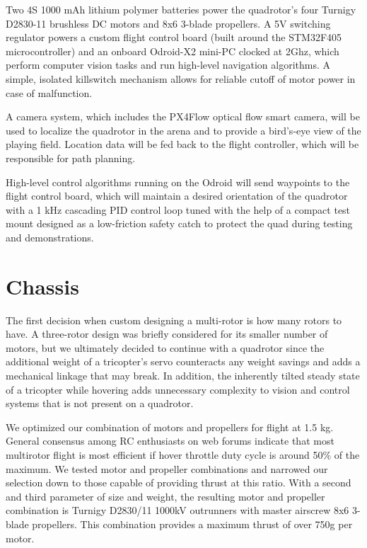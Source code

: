\documentclass[12pt,letterpaper]{article} \usepackage[margin=1in]{geometry}
\begin{document}
Two 4S 1000 mAh lithium polymer batteries power the quadrotor's four Turnigy
D2830-11 brushless DC motors and 8x6 3-blade propellers. A 5V switching
regulator powers a custom flight control board (built around the STM32F405
microcontroller) and an onboard Odroid-X2 mini-PC clocked at 2Ghz, which
perform computer vision tasks and run high-level navigation algorithms.
A simple, isolated killswitch mechanism allows for reliable cutoff of motor
power in case of malfunction.

A camera system, which includes the PX4Flow optical flow smart camera, will be
used to localize the quadrotor in the arena and to provide a bird's-eye view of
the playing field. Location data will be fed back to the flight controller,
which will be responsible for path planning.

High-level control algorithms running on the Odroid will send waypoints to the
flight control board, which will maintain a desired orientation of the quadrotor
with a 1 kHz cascading PID control loop tuned with the help of a compact test
mount designed as a low-friction safety catch to protect the quad during testing
and demonstrations.


\section*{Chassis}

The first decision when custom designing a multi-rotor is how many rotors to
have. A three-rotor design was briefly considered for its smaller number of
motors, but we ultimately decided to continue with a quadrotor since the
additional weight of a tricopter's servo counteracts any weight savings and
adds a mechanical linkage that may break. In addition, the inherently tilted
steady state of a tricopter while hovering adds unnecessary complexity to
vision and control systems that is not present on a quadrotor.

We optimized our combination of motors and propellers for flight at 1.5 kg.
General consensus among RC enthusiasts on web forums indicate that most
multirotor flight is most efficient if hover throttle duty cycle is around 50\%
of the maximum. We tested motor and propeller combinations and narrowed our
selection down to those capable of providing thrust at this ratio. With
a second and third parameter of size and weight, the resulting motor and
propeller combination is Turnigy D2830/11 1000kV outrunners with master
airscrew 8x6 3-blade propellers. This combination provides a maximum thrust of
over 750g per motor.
\end{document}
